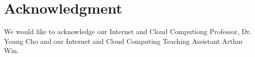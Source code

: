 \documentclass[conference]{IEEEtran}
\begin{document}








\section*{Acknowledgment}

We would like to acknowledge our Internet and Cloud Computiong Professor, Dr. Young Cho and our Internet and Cloud Computing  Teaching Assistant Arthur Win.
\end{document}
